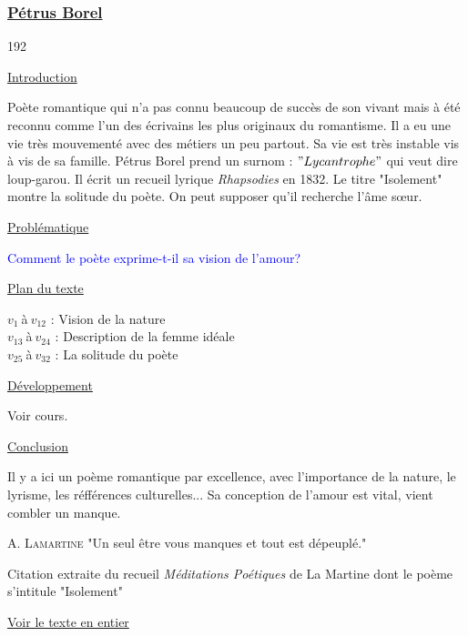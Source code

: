 \documentclass[12pt,a4paper]{article}
\begin{document}
			\subsubsection{\href{.extra/Bio/Borel.pdf}{P\'etrus Borel}}
\begin{dingautolist}{192}

\item \underline{Introduction} \par
		Po\`ete romantique qui n'a pas connu beaucoup de succ\`es de son vivant mais \`a \'et\'e reconnu comme l'un des \'ecrivains les plus originaux du romantisme. 
		Il a eu une vie tr\`es mouvement\'e avec des m\'etiers un peu partout. Sa vie est tr\`es instable vis \`a vis de sa famille. P\'etrus Borel prend un surnom : $"Lycantrophe"$ qui veut dire loup-garou. 
		Il \'ecrit un recueil lyrique \textit{Rhapsodies} en 1832. Le titre "Isolement" montre la solitude du po\`ete. On peut supposer qu'il recherche l'\^ame s\oe ur.

\item \underline{Probl\'ematique }\par
		\textcolor{blue}{Comment le po\`ete exprime-t-il sa vision de l'amour?}

\item \underline{Plan du texte} \par
		$v_{1}~$\`a$~v_{12}$ : Vision de la nature\\
		$v_{13}~$\`a$~v_{24}$ : Description de la femme id\'eale\\
		$v_{25}~$\`a$~v_{32}$ : La solitude du po\`ete

\item \underline{D\'eveloppement} \par
		Voir cours.

\item \underline{Conclusion} \par
		Il y a ici un po\`eme romantique par excellence, avec l'importance de la nature, le lyrisme, les r\'eff\'erences culturelles... Sa conception de l'amour est vital, vient combler un manque.\par 
		A. \textsc{Lamartine}
		"Un seul \^etre vous manques et tout est d\'epeupl\'e."
		
		Citation extraite du recueil \textit{M\'editations Po\'etiques} de La Martine dont le po\`eme s'intitule "Isolement"  		



\end{dingautolist}		
\href{.extra/Textes/Isolement.pdf}{Voir le texte en entier}
 \newpage
\end{document}
